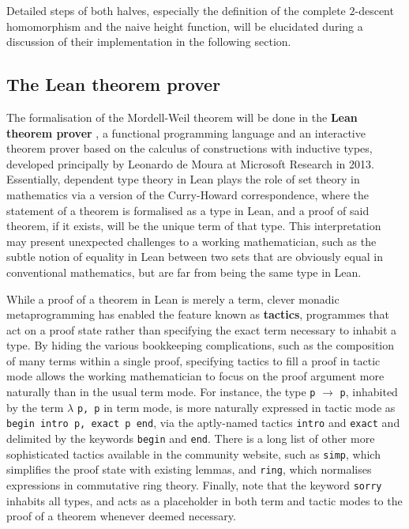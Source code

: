 Detailed steps of both halves, especially the definition of the complete $ 2 $-descent homomorphism and the naive height function, will be elucidated during a discussion of their implementation in the following section.

\subsection{The Lean theorem prover}

The formalisation of the Mordell-Weil theorem will be done in the \textbf{Lean theorem prover} \cite{Lean}, a functional programming language and an interactive theorem prover based on the calculus of constructions with inductive types, developed principally by Leonardo de Moura at Microsoft Research in 2013. Essentially, dependent type theory in Lean plays the role of set theory in mathematics via a version of the Curry-Howard correspondence, where the statement of a theorem is formalised as a type in Lean, and a proof of said theorem, if it exists, will be the unique term of that type. This interpretation may present unexpected challenges to a working mathematician, such as the subtle notion of equality in Lean between two sets that are obviously equal in conventional mathematics, but are far from being the same type in Lean.

While a proof of a theorem in Lean is merely a term, clever monadic metaprogramming has enabled the feature known as \textbf{tactics}, programmes that act on a proof state rather than specifying the exact term necessary to inhabit a type. By hiding the various bookkeeping complications, such as the composition of many terms within a single proof, specifying tactics to fill a proof in tactic mode allows the working mathematician to focus on the proof argument more naturally than in the usual term mode. For instance, the type \texttt{p} $ \to $ \texttt{p}, inhabited by the term $ \lambda $ \texttt{p, p} in term mode, is more naturally expressed in tactic mode as \texttt{begin intro p, exact p end}, via the aptly-named tactics \texttt{intro} and \texttt{exact} and delimited by the keywords \texttt{begin} and \texttt{end}. There is a long list of other more sophisticated tactics available in the community website, such as \texttt{simp}, which simplifies the proof state with existing lemmas, and \texttt{ring}, which normalises expressions in commutative ring theory. Finally, note that the keyword \texttt{sorry} inhabits all types, and acts as a placeholder in both term and tactic modes to the proof of a theorem whenever deemed necessary.

